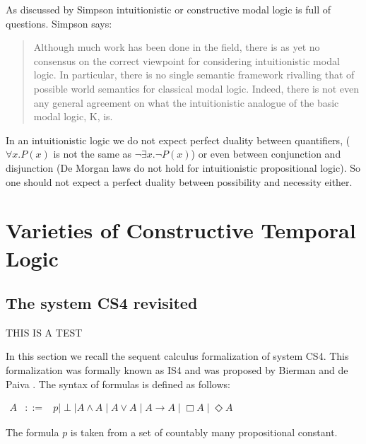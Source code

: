 \documentclass{article}
\begin{document}
As discussed by Simpson intuitionistic or constructive modal logic is full of questions. Simpson says:
\begin{quote}
Although much work has been done in the field, there is as yet no consensus
on the correct viewpoint for considering intuitionistic modal logic.  In particular,
there is no single semantic framework rivalling that of possible  world semantics
for classical modal logic.  Indeed, there is not even any general agreement on what
the intuitionistic analogue of the basic modal logic, K, is. 
\end{quote}
In an intuitionistic logic we do not expect perfect duality between quantifiers, ($\forall x.P(x)$ is not the same as $\neg \exists x.\neg P(x)$) or even between conjunction and disjunction (De Morgan laws do not hold for intuitionistic propositional logic). So one should not expect a perfect duality between possibility and necessity either.

\section{Varieties of Constructive Temporal Logic}

\subsection{The  system CS4 revisited} 

THIS IS A TEST

In this section we recall the sequent calculus formalization of system CS4.  This formalization was formally known as IS4 and was proposed by Bierman and de Paiva \cite{CS4}.  The syntax of formulas is defined as follows:
\begin{center}
    \begin{math}
        \begin{array}{lllllllll}
            A & ::= & p \mid \perp \mid A \land A \mid A \lor A \mid A \to A \mid \Box A \mid \Diamond A
        \end{array}
    \end{math}
\end{center}
The formula $p$ is taken from a set of countably many propositional
constant.
\end{document}
